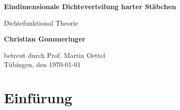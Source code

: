 \documentclass[12pt]{article}
\begin{document}
\begin{titlepage}
    \begin{center}
        \vspace*{1cm}
            
        \Huge
        \textbf{Eindimensionale Dichteverteilung harter Stäbchen}
            
        
        \large
        
            
        \vspace{0.7cm}
            Dichtefunktional Theorie
        \vspace{2cm}
        

        \textbf{Christian Gommeringer}
            
        \vspace*{7cm}
        
        
            
        
              
        
            
        
            
        \normalsize
        betreut durch Prof. Martin Oettel\\
        \vspace*{1cm}
        Tübingen, den \today
        
            
    \end{center}
\end{titlepage}

\section{Einfürung}
\end{document}
